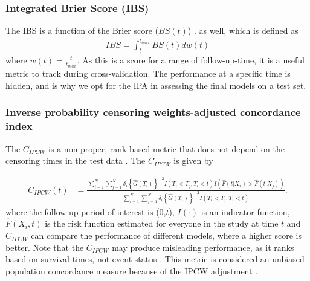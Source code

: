 \documentclass[APA,LATO1COL]{WileyNJD-v2}
\begin{document}
\hypertarget{integrated-brier-score-ibs}{%
\subsubsection{Integrated Brier Score (IBS)}\label{integrated-brier-score-ibs}}

The IBS is a function of the Brier score (\(BS(t)\)) \citep{graf1999}. as well,
which is defined as \begin{align}
IBS=\int_{t}^{t_{max}}BS(t)dw(t)
\end{align} where $w(t)=\frac{t}{t_{max}}$. As this is a score for a range of follow-up-time,
it is a useful metric to track during cross-validation. The performance at a specific time
is hidden, and is why we opt for the IPA in assessing the final models on a test set.

\hypertarget{inverse-probability-censoring-weights-adjusted-concordance-index}{%
\subsubsection{Inverse probability censoring weights-adjusted
concordance
index}\label{inverse-probability-censoring-weights-adjusted-concordance-index}}

The \(C_{IPCW}\) is a non-proper, rank-based metric that does not depend
on the censoring times in the test data \citep{uno2011}. The
\(C_{IPCW}\) is given by

\begin{align} \label{eq:cidx}
C_{IPCW}(t) &= \frac{\sum^{N}_{i=1}\sum^{N}_{j=1}\delta_{i}\left\{\widehat{G}(T_{i})\right\}^{-2} I(T_{i}<T_{j},T_{i}<t) I\left(\widehat{F}(t|X_{i})>\widehat{F}(t|X_{j})\right)}{\sum^{N}_{i=1}\sum^{N}_{j=1}\delta_{i}\left\{\widehat{G}(T_{i})\right\}^{-2} I(T_{i}<T_{j},T_{i}<t)}.
\end{align} where the follow-up period of interest is (0,\(t\)),
\(I(\cdot)\) is an indicator function, \(\widehat{F}(X_{i},t)\) is the
risk function estimated for everyone in the study at time \(t\) and
\(C_{IPCW}\) can compare the performance of different models, where a
higher score is better. Note that the \(C_{IPCW}\) may produce
misleading performance, as it ranks based on survival times, not event
status \citep{cindexfails2019}. This metric is considered an unbiased
population concordance measure because of the IPCW adjustment
\citep{uno2011}.
\end{document}
